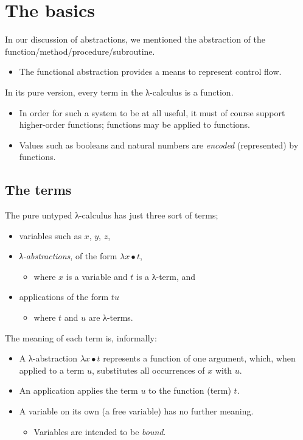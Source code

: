 \documentclass[11pt]{article}
\theoremstyle{definition}
\begin{document}
\section{The basics}
\label{sec:org5cdcc42}

In our discussion of abstractions, we mentioned
the abstraction of the function/method/procedure/subroutine.
\begin{itemize}
\item The functional abstraction provides a means
to represent control flow.
\end{itemize}

In its pure version, every term in the λ-calculus
is a function.
\begin{itemize}
\item In order for such a system to be at all useful,
it must of course support higher-order functions;
functions may be applied to functions.
\item Values such as booleans and natural numbers
are \emph{encoded} (represented) by functions.
\end{itemize}

\subsection{The terms}
\label{sec:org90085d3}

The pure untyped λ-calculus has just three sort of terms;
\begin{itemize}
\item variables such as \(x\), \(y\), \(z\),
\item \emph{λ-abstractions}, of the form \(λ x ∙ t\),
\begin{itemize}
\item where \(x\) is a variable and \(t\) is a λ-term, and
\end{itemize}
\item applications of the form \(t u\)
\begin{itemize}
\item where \(t\) and \(u\) are λ-terms.
\end{itemize}
\end{itemize}

The meaning of each term is, informally:
\begin{itemize}
\item A λ-abstraction \(λ x ∙ t\) represents a function of one argument,
which, when applied to a term \(u\), substitutes
all occurrences of \(x\) with \(u\).
\item An application applies the term \(u\) to the function (term) \(t\).
\item A variable on its own (a free variable) has no further meaning.
\begin{itemize}
\item Variables are intended to be \emph{bound}.
\end{itemize}
\end{itemize}
\end{document}

